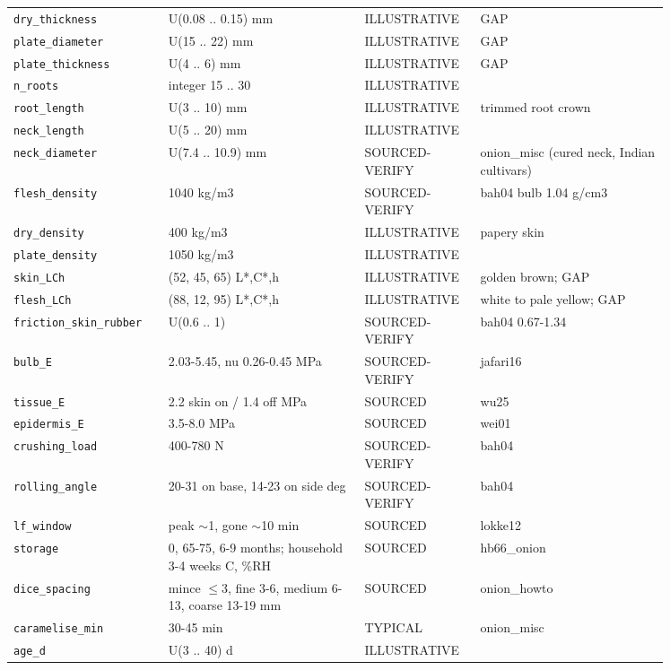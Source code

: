 \documentclass[10.5pt,a4paper]{article}
\begin{document}
{\begin{longtable}{@{}p{0.2\linewidth}p{0.27\linewidth}p{0.12\linewidth}p{0.26\linewidth}@{}}
\texttt{dry\_\allowbreak{}thickness} & U(0.08 .. 0.15) mm & ILLUSTRATIVE & GAP \\
\texttt{plate\_\allowbreak{}diameter} & U(15 .. 22) mm & ILLUSTRATIVE & GAP \\
\texttt{plate\_\allowbreak{}thickness} & U(4 .. 6) mm & ILLUSTRATIVE & GAP \\
\texttt{n\_\allowbreak{}roots} & integer 15 .. 30 & ILLUSTRATIVE &  \\
\texttt{root\_\allowbreak{}length} & U(3 .. 10) mm & ILLUSTRATIVE & trimmed root crown \\
\texttt{neck\_\allowbreak{}length} & U(5 .. 20) mm & ILLUSTRATIVE &  \\
\texttt{neck\_\allowbreak{}diameter} & U(7.4 .. 10.9) mm & SOURCED-VERIFY & onion\_misc (cured neck, Indian cultivars) \\
\texttt{flesh\_\allowbreak{}density} & 1040 kg/m3 & SOURCED-VERIFY & bah04 bulb 1.04 g/cm3 \\
\texttt{dry\_\allowbreak{}density} & 400 kg/m3 & ILLUSTRATIVE & papery skin \\
\texttt{plate\_\allowbreak{}density} & 1050 kg/m3 & ILLUSTRATIVE &  \\
\texttt{skin\_\allowbreak{}LCh} & (52, 45, 65) L*,C*,h & ILLUSTRATIVE & golden brown; GAP \\
\texttt{flesh\_\allowbreak{}LCh} & (88, 12, 95) L*,C*,h & ILLUSTRATIVE & white to pale yellow; GAP \\
\texttt{friction\_\allowbreak{}skin\_\allowbreak{}rubber} & U(0.6 .. 1) & SOURCED-VERIFY & bah04 0.67-1.34 \\
\texttt{bulb\_\allowbreak{}E} & 2.03-5.45, nu 0.26-0.45 MPa & SOURCED-VERIFY & jafari16 \\
\texttt{tissue\_\allowbreak{}E} & 2.2 skin on / 1.4 off MPa & SOURCED & wu25 \\
\texttt{epidermis\_\allowbreak{}E} & 3.5-8.0 MPa & SOURCED & wei01 \\
\texttt{crushing\_\allowbreak{}load} & 400-780 N & SOURCED-VERIFY & bah04 \\
\texttt{rolling\_\allowbreak{}angle} & 20-31 on base, 14-23 on side deg & SOURCED-VERIFY & bah04 \\
\texttt{lf\_\allowbreak{}window} & peak $\sim$1, gone $\sim$10 min & SOURCED & lokke12 \\
\texttt{storage} & 0, 65-75, 6-9 months; household 3-4 weeks C, \%RH & SOURCED & hb66\_onion \\
\texttt{dice\_\allowbreak{}spacing} & mince $\le$3, fine 3-6, medium 6-13, coarse 13-19 mm & SOURCED & onion\_howto \\
\texttt{caramelise\_\allowbreak{}min} & 30-45 min & TYPICAL & onion\_misc \\
\texttt{age\_\allowbreak{}d} & U(3 .. 40) d & ILLUSTRATIVE &  \\\bottomrule\end{longtable}}
\end{document}
